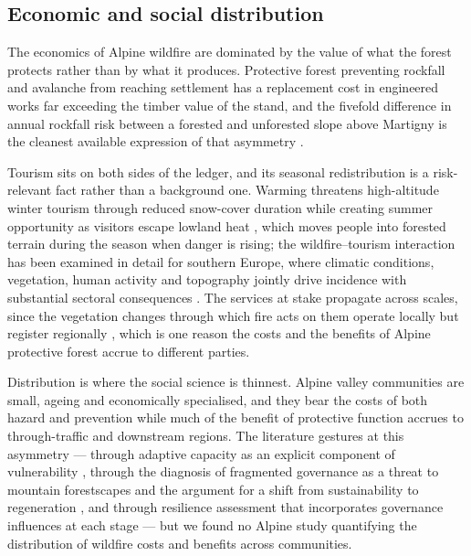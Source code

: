 \documentclass[11pt,a4paper]{article}
\begin{document}
\subsection{Economic and social distribution}

The economics of Alpine wildfire are dominated by the value of what the forest protects rather than by what it produces. Protective forest preventing rockfall and avalanche from reaching settlement has a replacement cost in engineered works far exceeding the timber value of the stand, and the fivefold difference in annual rockfall risk between a forested and unforested slope above Martigny is the cleanest available expression of that asymmetry \citep{moos_climate_2021}.

Tourism sits on both sides of the ledger, and its seasonal redistribution is a risk-relevant fact rather than a background one. Warming threatens high-altitude winter tourism through reduced snow-cover duration while creating summer opportunity as visitors escape lowland heat \citep{pede_mountain_2022}, which moves people into forested terrain during the season when danger is rising; the wildfire--tourism interaction has been examined in detail for southern Europe, where climatic conditions, vegetation, human activity and topography jointly drive incidence with substantial sectoral consequences \citep{abrham_wildfires_2024}. The services at stake propagate across scales, since the vegetation changes through which fire acts on them operate locally but register regionally \citep{vukomanovic_systematic_2019}, which is one reason the costs and the benefits of Alpine protective forest accrue to different parties.

Distribution is where the social science is thinnest. Alpine valley communities are small, ageing and economically specialised, and they bear the costs of both hazard and prevention while much of the benefit of protective function accrues to through-traffic and downstream regions. The literature gestures at this asymmetry --- through adaptive capacity as an explicit component of vulnerability \citep{riviere_mapping_2023}, through the diagnosis of fragmented governance as a threat to mountain forestscapes and the argument for a shift from sustainability to regeneration \citep{majlingova_sustainability_2025}, and through resilience assessment that incorporates governance influences at each stage \citep{lockwood_biodiversity_2014} --- but we found no Alpine study quantifying the distribution of wildfire costs and benefits across communities.
\end{document}
